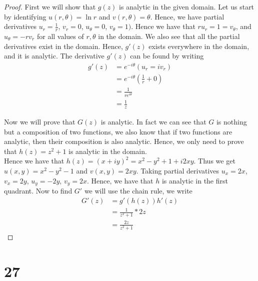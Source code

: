 \documentclass{article}
\begin{document}
    \begin{proof}
        First we will show that $g(z)$ is analytic in the given domain. Let us start by identifying
        $u(r,\theta) = \ln r$ and $v(r, \theta) = \theta$. Hence, we have partial derivatives
        $u_r = \frac{1}{r}$, $v_r = 0$, $u_\theta = 0$, $v_\theta = 1)$. Hence we have that
        $ru_r = 1 = v_\theta$, and $u_\theta = -rv_r$ for all values of $r, \theta$ in the domain.
        We also see that all the partial derivatives exist in the domain. Hence, $g'(z)$ exists
        everywhere in the domain, and it is analytic. The derivative $g'(z)$ can be found by writing
        \begin{align*}
            g'(z) &= e^{-i\theta}(u_r = iv_r) \\
                &= e^{-i\theta}(\frac{1}{r} + 0) \\
                &= \frac{1}{re^{i\theta}} \\
                &= \frac{1}{z}
        \end{align*}
        
        \vspace{0.25cm}
        Now we will prove that $G(z)$ is analytic. In fact we can see that $G$ is nothing
        but a composition of two functions, we also know that if two functions are analytic,
        then their composition is also analytic. Hence, we only need to prove that
        $h(z)=z^2 + 1$ is analytic in the domain. \\
        Hence we have that $h(z)=(x+ iy)^2 = x^2 - y^2 + 1 + i2xy$.
        Thus we get $u(x,y) = x^2 - y^2 - 1$ and $v(x,y) = 2xy$. Taking partial derivatives
        $u_x = 2x$, $v_x =2y$, $u_y =-2y$, $v_y =2x$. Hence, we have that $h$ is analytic in 
        the first quadrant. Now to find $G'$ we will use the chain rule, we write
        \begin{align*}
            G'(z) &= g'(h(z))h'(z) \\
                &= \frac{1}{z^2 + 1}*2z \\
                &= \frac{2z}{z^2 + 1}
        \end{align*}
    \end{proof}
    \section*{27}
\end{document}
